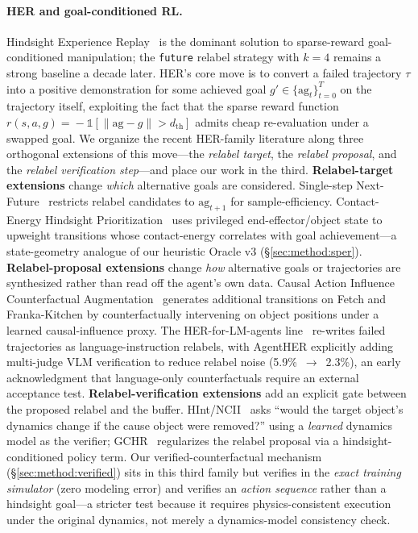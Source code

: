 \documentclass{article}
\begin{document}
\paragraph{HER and goal-conditioned RL.}
Hindsight Experience Replay~\citep{andrychowicz2017her} is the dominant
solution to sparse-reward goal-conditioned manipulation; the \texttt{future}
relabel strategy with $k\!=\!4$ remains a strong baseline a decade later.
HER's core move is to convert a failed trajectory $\tau$ into a positive
demonstration for some achieved goal $g'\!\in\!\{\text{ag}_t\}_{t=0}^{T}$
on the trajectory itself, exploiting the fact that the sparse reward
function $r(s,a,g)\!=\!-\mathbb{1}[\|\text{ag}-g\|\!>\!d_{\text{th}}]$
admits cheap re-evaluation under a swapped goal. We organize the recent
HER-family literature along three orthogonal extensions of this move---the
\emph{relabel target}, the \emph{relabel proposal}, and the \emph{relabel
verification step}---and place our work in the third.
\textbf{Relabel-target extensions} change \emph{which} alternative goals are
considered. Single-step Next-Future~\citep{ozgur2025nextfuture} restricts
relabel candidates to $\text{ag}_{t+1}$ for sample-efficiency. Contact-Energy
Hindsight Prioritization~\citep{sayar2023cebp} uses privileged
end-effector/object state to upweight transitions whose contact-energy
correlates with goal achievement---a state-geometry analogue of our
heuristic Oracle v3 (\S\ref{sec:method:sper}).
\textbf{Relabel-proposal extensions} change \emph{how} alternative goals or
trajectories are synthesized rather than read off the agent's own data.
Causal Action Influence Counterfactual Augmentation~\citep{urpi2024caiac}
generates additional transitions on Fetch and Franka-Kitchen by counterfactually
intervening on object positions under a learned causal-influence proxy. The
HER-for-LM-agents line~\citep{hu2026echo,ding2026agentHER} re-writes failed
trajectories as language-instruction relabels, with AgentHER explicitly
adding multi-judge VLM verification to reduce relabel noise (5.9\%~$\to$~2.3\%),
an early acknowledgment that language-only counterfactuals require an
external acceptance test.
\textbf{Relabel-verification extensions} add an explicit gate between the
proposed relabel and the buffer. HInt/NCII~\citep{chuck2025hint} asks
``would the target object's dynamics change if the cause object were
removed?'' using a \emph{learned} dynamics model as the verifier;
GCHR~\citep{lei2025gchr} regularizes the relabel proposal via a
hindsight-conditioned policy term. Our verified-counterfactual mechanism
(\S\ref{sec:method:verified}) sits in this third family but verifies in
the \emph{exact training simulator} (zero modeling error) and verifies an
\emph{action sequence} rather than a hindsight goal---a stricter test
because it requires physics-consistent execution under the original
dynamics, not merely a dynamics-model consistency check.
\end{document}
